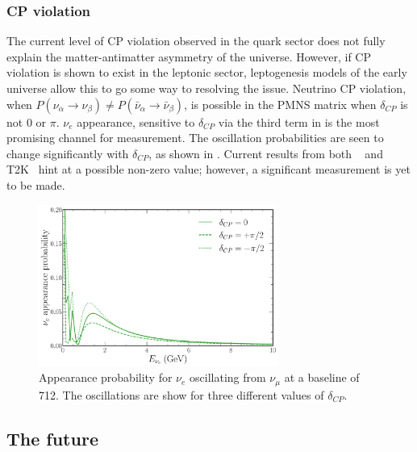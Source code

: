 \subsubsection*{CP violation} %

The current level of CP violation observed in the quark sector does not fully explain the
matter-antimatter asymmetry of the universe. However, if CP violation is shown to exist in the
leptonic sector, leptogenesis models of the early universe allow this to go some way to resolving
the issue. Neutrino CP violation, when $P(\nu_{\alpha}\rightarrow\nu_{\beta}) \neq
P(\bar{\nu}_{\alpha}\rightarrow\bar{\nu}_{\beta})$, is possible in the PMNS matrix when
$\delta_{CP}$ is not $0$ or $\pi$. $\nu_{e}$ appearance, sensitive to $\delta_{CP}$ via the third
term in  is the most promising channel for measurement. The oscillation
probabilities are seen to change significantly with $\delta_{CP}$, as shown in
. Current results from both \nova~\cite{acero2019} and
T2K~\cite{abe2018_2} hint at a possible non-zero value; however, a significant measurement is yet
to be made.

\begin{figure} %
    \includegraphics[origin=c,width=0.7\textwidth]{diagrams/7-results/explore_osc_cp_probs.pdf}
    \caption[$\nu_{e}$ appearance probability for different $\delta_{CP}$ values]
    {Appearance probability for $\nu_{e}$ oscillating from $\nu_{\mu}$ at a baseline of
    \SI{712}{}. The oscillations are show for three different values of $\delta_{CP}$.}
    \label{fig:osc_cp_probs}
\end{figure}

\subsection{The future} %
\label{sec:theory_status_future} %

